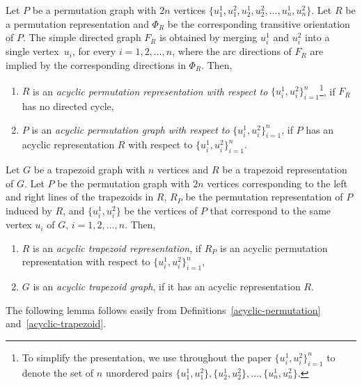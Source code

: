 \documentclass[proceedings]{stacs}
\begin{document}
\begin{definition}
\label{acyclic-permutation}Let $P$ be a permutation graph with $2n$ vertices 
$\{u_{1}^{1},u_{1}^{2},u_{2}^{1},u_{2}^{2},\ldots ,u_{n}^{1},u_{n}^{2}\}$.
Let $R$ be a permutation representation and $\Phi _{R}$ be the corresponding
transitive orientation of $P$. The simple directed graph $F_{R}$ is obtained
by merging $u_{i}^{1}$ and $u_{i}^{2}$ into a single vertex~$u_{i}$, for
every $i=1,2,\ldots ,n$, where the arc directions of $F_{R}$ are implied by
the corresponding directions in $\Phi _{R}$. Then, 
\begin{enumerate}
\item $R$ is an \emph{acyclic permutation representation with respect to} $%
\{u_{i}^{1},u_{i}^{2}\}_{i=1}^{n}$\footnote{%
To simplify the presentation, we use throughout the paper $%
\{u_{i}^{1},u_{i}^{2}\}_{i=1}^{n}$ to denote the set of $n$ unordered pairs $%
\{u_{1}^{1},u_{1}^{2}\}, \{u_{2}^{1},u_{2}^{2}\}, \ldots,
\{u_{n}^{1},u_{n}^{2}\}$.
}, if $F_{R}$ has no directed cycle, 
\item $P$ is an \emph{acyclic permutation graph with respect to} $%
\{u_{i}^{1},u_{i}^{2}\}_{i=1}^{n}$, if $P$ has an acyclic representation $R$
with respect to $\{u_{i}^{1},u_{i}^{2}\}_{i=1}^{n}$.
\end{enumerate}
\end{definition}

\begin{definition}
\label{acyclic-trapezoid}Let $G$ be a trapezoid graph with $n$ vertices and $%
R$ be a trapezoid representation of $G$. Let $P$ be the permutation graph
with $2n$ vertices corresponding to the left and right lines of the
trapezoids in $R$, $R_{P}$ be the permutation representation of $P$ induced
by $R$, and $\{u_{i}^{1},u_{i}^{2}\}$ be the vertices of $P$ that correspond
to the same vertex $u_{i}$ of $G$, $i=1,2,\ldots ,n$. Then, %
\begin{enumerate}
\item $R$ is an \emph{acyclic trapezoid representation}, if $R_{P}$ is an
acyclic permutation representation with respect to $\{u_{i}^{1},u_{i}^{2}%
\}_{i=1}^{n}$, 
\item $G$ is an \emph{acyclic trapezoid graph}, if it has an acyclic
representation $R$.
\end{enumerate}
\end{definition}

The following lemma follows easily from Definitions~\ref{acyclic-permutation}
and~\ref{acyclic-trapezoid}. 
\end{document}
